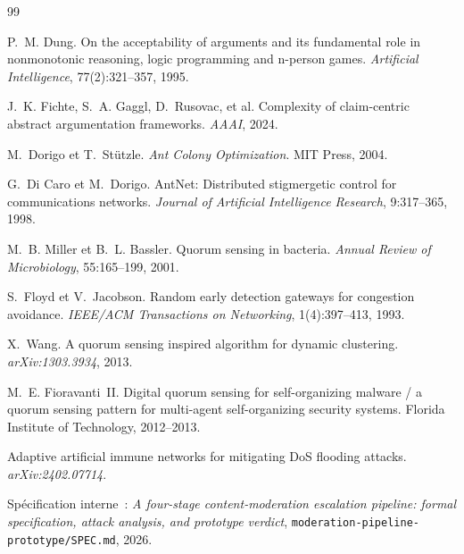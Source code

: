 \documentclass[11pt]{article}
\begin{document}
\begin{thebibliography}{99}

 P.~M. Dung. On the acceptability of arguments and its
fundamental role in nonmonotonic reasoning, logic programming and
n-person games. \emph{Artificial Intelligence}, 77(2):321--357, 1995.

 J.~K. Fichte, S.~A. Gaggl, D.~Rusovac, et al.
Complexity of claim-centric abstract argumentation frameworks.
\emph{AAAI}, 2024.

 M.~Dorigo et T.~Stützle. \emph{Ant Colony
Optimization}. MIT Press, 2004.

 G.~Di Caro et M.~Dorigo. AntNet: Distributed
stigmergetic control for communications networks. \emph{Journal of
Artificial Intelligence Research}, 9:317--365, 1998.

 M.~B. Miller et B.~L. Bassler. Quorum sensing in
bacteria. \emph{Annual Review of Microbiology}, 55:165--199, 2001.

 S.~Floyd et V.~Jacobson. Random early detection
gateways for congestion avoidance. \emph{IEEE/ACM Transactions on
Networking}, 1(4):397--413, 1993.

 X.~Wang. A quorum sensing inspired algorithm for
dynamic clustering. \emph{arXiv:1303.3934}, 2013.

 M.~E. Fioravanti~II. Digital quorum sensing for
self-organizing malware / a quorum sensing pattern for multi-agent
self-organizing security systems. Florida Institute of Technology,
2012--2013.

 Adaptive artificial immune networks for
mitigating DoS flooding attacks. \emph{arXiv:2402.07714}.

 Spécification interne~: \emph{A four-stage
content-moderation escalation pipeline: formal specification, attack
analysis, and prototype verdict}, \texttt{moderation-pipeline-prototype/SPEC.md},
2026.

\end{thebibliography}
\end{document}
